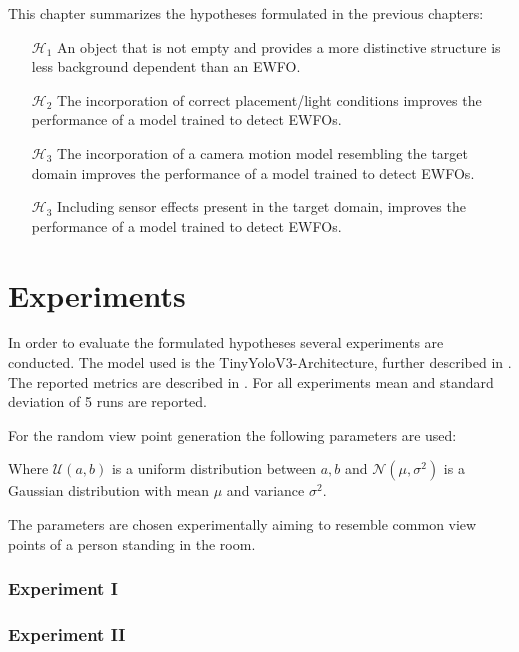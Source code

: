 This chapter summarizes the hypotheses formulated in the previous chapters:

\begin{enumerate}
	\item[$\mathcal{H}_1$] An object that is not empty and provides a more distinctive structure is less background dependent than an \ac{EWFO}.
	
	\item[$\mathcal{H}_2$] The incorporation of correct placement/light conditions improves the performance of a model trained to detect \acp{EWFO}.
	
	\item[$\mathcal{H}_3$] The incorporation of a camera motion model resembling the target domain improves the performance of a model trained to detect \acp{EWFO}. 
	
	\item[$\mathcal{H}_3$] Including sensor effects present in the target domain, improves the performance of a model trained to detect \acp{EWFO}. 
	
\end{enumerate}



\section{Experiments}
\label{sec:training:experiments}
In order to evaluate the formulated hypotheses several experiments are conducted. The model used is the TinyYoloV3-Architecture, further described in . The reported metrics are described in . For all experiments mean and standard deviation of 5 runs are reported.

For the random view point generation the following parameters are used:


Where $ \mathcal{U}(a,b)$ is a uniform distribution between $a,b$ and $\mathcal{N}(\mu,\sigma^2)$ is a Gaussian distribution with mean $\mu$ and variance $\sigma^2$.

The parameters are chosen experimentally aiming to resemble common view points of a person standing in the room.

\subsubsection{Experiment I}


\subsubsection{Experiment II}



